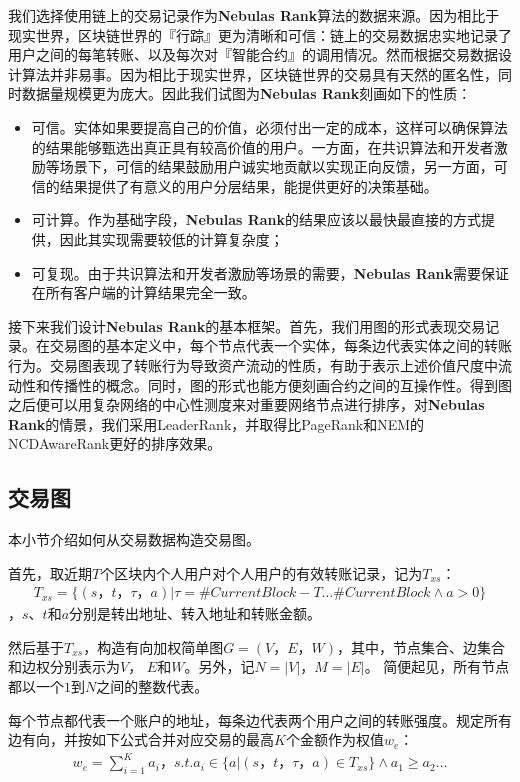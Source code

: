 我们选择使用链上的交易记录作为\textbf{Nebulas Rank}算法的数据来源。因为相比于现实世界，区块链世界的『行踪』更为清晰和可信：链上的交易数据忠实地记录了用户之间的每笔转账、以及每次对『智能合约』的调用情况。然而根据交易数据设计算法并非易事。因为相比于现实世界，区块链世界的交易具有天然的匿名性，同时数据量规模更为庞大。因此我们试图为\textbf{Nebulas Rank}刻画如下的性质：
\begin{itemize}
	\item 可信。实体如果要提高自己的价值，必须付出一定的成本，这样可以确保算法的结果能够甄选出真正具有较高价值的用户。一方面，在共识算法和开发者激励等场景下，可信的结果鼓励用户诚实地贡献以实现正向反馈，另一方面，可信的结果提供了有意义的用户分层结果，能提供更好的决策基础。
	\item 可计算。作为基础字段，\textbf{Nebulas Rank}的结果应该以最快最直接的方式提供，因此其实现需要较低的计算复杂度；
	\item 可复现。由于共识算法和开发者激励等场景的需要，\textbf{Nebulas Rank}需要保证在所有客户端的计算结果完全一致。
\end{itemize}

接下来我们设计\textbf{Nebulas Rank}的基本框架。首先，我们用图的形式表现交易记录。在交易图的基本定义中，每个节点代表一个实体，每条边代表实体之间的转账行为\cite{Tschorsch2015}。交易图表现了转账行为导致资产流动的性质，有助于表示上述价值尺度中流动性和传播性的概念。同时，图的形式也能方便刻画合约之间的互操作性。得到图之后便可以用复杂网络的中心性测度来对重要网络节点进行排序，对\textbf{Nebulas Rank}的情景，我们采用LeaderRank\cite{Chen2013}\cite{Li2014}，并取得比PageRank和NEM\cite{nem}的NCDAwareRank更好的排序效果。

\subsection{交易图} \label{subsec:txg}
本小节介绍如何从交易数据构造交易图。

首先，取近期$T$个区块内个人用户对个人用户的有效转账记录，记为$T_{xs}$：
\begin{align}
T_{xs} = \{(s，t，\tau， a)| \tau = \#CurrentBlock-T \dots \#CurrentBlock \land a > 0 \}
\end{align}
，$s$、$t$和$a$分别是转出地址、转入地址和转账金额。

然后基于$T_{xs}$，构造有向加权简单图$G=(V， E， W)$，其中，节点集合、边集合和边权分别表示为$V$， $E$和$W$。另外，记$N = |V|$，$M = |E|$。 简便起见，所有节点都以一个$1$到$N$之间的整数代表。

每个节点都代表一个账户的地址，每条边代表两个用户之间的转账强度。规定所有边有向，并按如下公式合并对应交易的最高$K$个金额作为权值$w_e$：
\begin{align}\label{formula:edgeweight}
w_e = \sum_{i=1}^K a_i， s.t. a_i \in \{a|(s，t，\tau，a) \in T_{xs} \} \land a_1 \geq a_2 \dots
\end{align}

